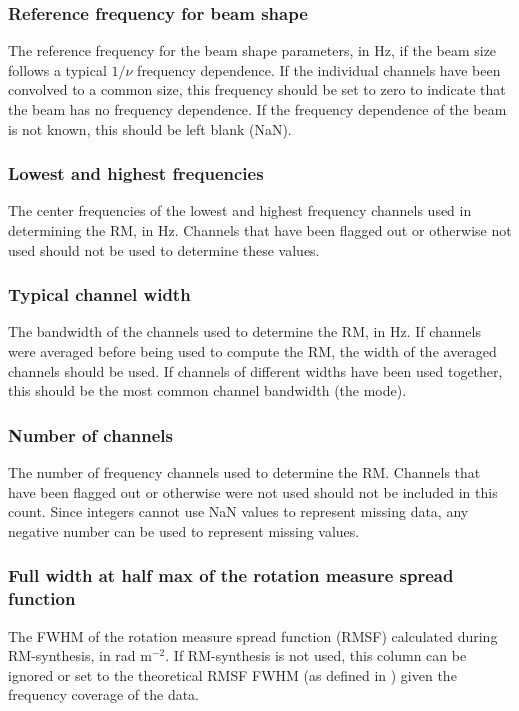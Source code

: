 \documentclass[10pt,modern]{aastex63}
\begin{document}
\subsubsection{Reference frequency for beam shape}
The reference frequency for the beam shape parameters, in Hz, if the beam size follows a typical $1/\nu$ frequency dependence. If the individual channels have been convolved to a common size, this frequency should be set to zero to indicate that the beam has no frequency dependence. If the frequency dependence of the beam is not known, this should be left blank (NaN).

\subsubsection{Lowest and highest frequencies}
The center frequencies of the lowest and highest frequency channels used in determining the RM, in Hz. Channels that have been flagged out or otherwise not used should not be used to determine these values.

\subsubsection{Typical channel width}
The bandwidth of the channels used to determine the RM, in Hz. If channels were averaged before being used to compute the RM, the width of the averaged channels should be used. If channels of different widths have been used together, this should be the most common channel bandwidth (the mode).

\subsubsection{Number of channels}
The number of frequency channels used to determine the RM. Channels that have been flagged out or otherwise were not used should not be included in this count. Since integers cannot use NaN values to represent missing data, any negative number can be used to represent missing values.

\subsubsection{Full width at half max of the rotation measure spread function}
The FWHM of the rotation measure spread function (RMSF) calculated during RM-synthesis, in rad m$^{-2}$. If RM-synthesis is not used, this column can be ignored or set to the theoretical RMSF FWHM (as defined in \citealt{Brentjens2005}) given the frequency coverage of the data.
\end{document}
